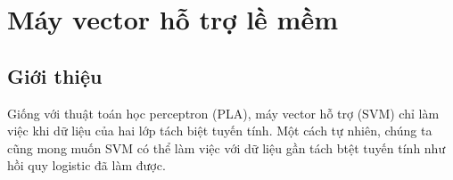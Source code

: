 \chapter{Máy vector hỗ trợ lề mềm}


\section{Giới thiệu}
Giống với thuật toán học perceptron (PLA), máy vector hỗ trợ (SVM) chỉ làm việc khi dữ liệu của hai lớp tách biệt tuyến tính. Một cách tự nhiên, chúng ta cũng mong muốn SVM có thể làm việc với dữ liệu gần tách btệt tuyến tính như hồi quy logistic đã làm được.









